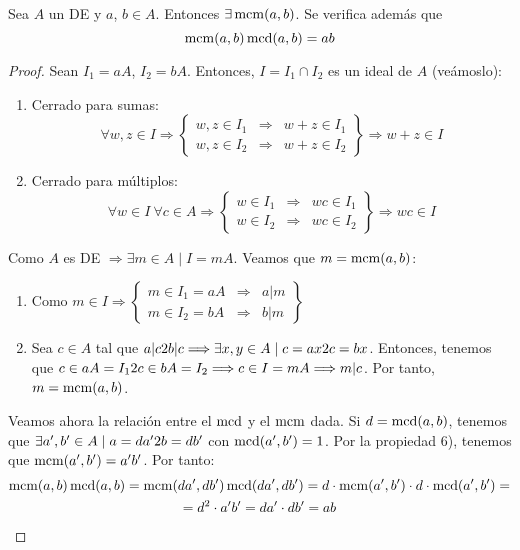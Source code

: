 \begin{teo}
    \label{teo:Existenciamcm}
    Sea $A$ un DE y $a$, $b \in A$. Entonces $\exists \operatorname{mcm}(a,b)$. Se verifica además que 
    $$\operatorname{mcm}(a,b)\operatorname{mcd}(a,b) = ab$$
\end{teo}
\begin{proof}
    Sean $I_1 = aA$, $I_2=bA$. Entonces, $I=I_1 \cap I_2$ es un ideal de $A$ (veámoslo):
    \begin{enumerate}
        \item Cerrado para sumas:
        $$\forall w,z \in I \Longrightarrow \left\{ \begin{array}{lll}
            w,z \in I_1 & \Longrightarrow & w+z \in I_1 \\
            w,z \in I_2 & \Longrightarrow & w+z \in I_2
        \end{array} \right\} \Longrightarrow w+z \in I$$

        \item Cerrado para múltiplos:
        $$\forall w \in I ~\forall c \in A \Longrightarrow \left\{ \begin{array}{lll}
            w \in I_1 & \Longrightarrow & wc \in I_1 \\
            w \in I_2 & \Longrightarrow & wc \in I_2
        \end{array} \right\} \Longrightarrow wc \in I$$
    \end{enumerate}    
    
    Como $A$ es DE $\Longrightarrow \exists m \in A \mid I = mA$. Veamos que $m=\operatorname{mcm}(a,b)$:
    \begin{enumerate}
        \item Como $\displaystyle m \in I \Longrightarrow \left\{ \begin{array}{lll}
            m \in I_1 = aA & \Longrightarrow & a|m \\
            m \in I_2 = bA & \Longrightarrow & b|m
        \end{array} \right\}$

        \item Sea $c \in A$ tal que $a|c 2 b|c \Longrightarrow \exists x,y \in A \mid c=ax 2 c=bx$. Entonces, tenemos que $c \in aA=I_1 2 c\in bA=I_2 \Longrightarrow c \in I =mA \Longrightarrow m|c$. Por tanto, $m = \operatorname{mcm}(a,b)$.
    \end{enumerate}

    Veamos ahora la relación entre el $\operatorname{mcd}$ y el $\operatorname{mcm}$ dada. Si $d=\operatorname{mcd}(a,b)$, tenemos que $\exists a', b' \in A \mid a=da' 2 b=db'$ con $\operatorname{mcd}(a',b')=1$. Por la propiedad 6), tenemos que $\operatorname{mcm}(a',b')=a'b'$. Por tanto:
    \begin{multline*}
        \operatorname{mcm}(a,b)\operatorname{mcd}(a,b) = \operatorname{mcm}(da',db')\operatorname{mcd}(da',db') = d\cdot \operatorname{mcm}(a',b') \cdot d \cdot \operatorname{mcd}(a',b') = \\
        =d^2 \cdot a'b' = da' \cdot db' = ab
    \end{multline*}
\end{proof}

